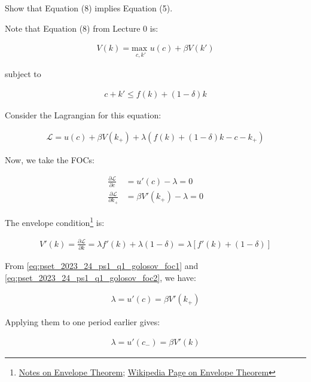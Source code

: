 Show that Equation (8) implies Equation (5).
\\


Note that Equation (8) from Lecture 0 is:

\begin{align}
    V(k) = \underset{c, k'}{\text{max }} u(c) + \beta V(k') 
\end{align}

subject to

\begin{align}
    c + k' \leq f(k) + (1 - \delta)k
\end{align}

Consider the Lagrangian for this equation:

\begin{align}
    \mathcal{L} = u(c) + \beta V(k_+) + \lambda(f(k) + (1-\delta)k - c - k_+)
\end{align}

Now, we take the FOCs:

\begin{align}
    \frac{\partial \mathcal{L}}{\partial c} &= u'(c) - \lambda = 0 \label{eq:pset_2023_24_ps1_q1_golosov_foc1} \\
    \frac{\partial \mathcal{L}}{\partial k_+} &= \beta V'(k_+) - \lambda = 0 \label{eq:pset_2023_24_ps1_q1_golosov_foc2}
\end{align}

The envelope condition\footnote{\href{https://www.sfu.ca/~wainwrig/Econ331/env-theorem2.pdf}{Notes on Envelope Theorem}; \href{https://en.wikipedia.org/wiki/Envelope_theorem}{Wikipedia Page on Envelope Theorem}} is:

\begin{align}
    V'(k) = \frac{\partial \mathcal{L}}{\partial k} = \lambda f'(k) + \lambda(1-\delta) = \lambda[f'(k) + (1 - \delta)]
\end{align}

From \eqref{eq:pset_2023_24_ps1_q1_golosov_foc1} and \eqref{eq:pset_2023_24_ps1_q1_golosov_foc2}, we have:

\begin{align}
    \lambda = u'(c) = \beta V'(k_+) \label{eq:pset_2023_24_ps1_q1_golosov_lambda}
\end{align}

Applying them to one period earlier gives:

\begin{align}
    \lambda = u'(c_-) = \beta V'(k) \label{eq:pset_2023_24_ps1_q1_golosov_lambda_earlier}
\end{align} 

